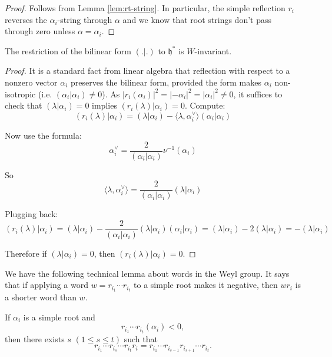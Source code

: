 \documentclass[12pt]{article}
\begin{document}
\begin{proof}
    Follows from Lemma \ref{lem:rt-string}. In particular, the simple reflection $r_i$ reverses the $\alpha_i$-string through $\alpha$ and we know that root strings don't pass through zero unless $\alpha = \alpha_i$.
\end{proof}

\begin{proposition}[3.9]
    The restriction of the bilinear form $(.|.)$ to $\mathfrak{h}^*$ is $W$-invariant.
\end{proposition}

\begin{proof}
    It is a standard fact from linear algebra that reflection with respect to a nonzero vector $\alpha_i$ preserves the bilinear form, provided the form makes $\alpha_i$ non-isotropic (i.e. $(\alpha_i|\alpha_i)\neq 0$). As $|r_i(\alpha_i)|^2 = |-\alpha_i|^2 = |\alpha_i|^2 \neq 0$, it suffices to check that $(\lambda|\alpha_i) = 0$ implies
    $(r_i(\lambda)|\alpha_i) = 0$. Compute:
    \[
        (r_i(\lambda)|\alpha_i) = (\lambda|\alpha_i) - \langle \lambda, \alpha_i^\vee \rangle (\alpha_i|\alpha_i)
    \]

    Now use the formula:
    \[
        \alpha_i^\vee = \frac{2}{(\alpha_i|\alpha_i)}\nu^{-1}(\alpha_i)
    \]

    So
    \[
        \langle \lambda, \alpha_i^\vee \rangle = \frac{2}{(\alpha_i|\alpha_i)} (\lambda|\alpha_i)
    \]

    Plugging back:
    \[
        (r_i(\lambda)|\alpha_i)
        = (\lambda|\alpha_i) - \frac{2}{(\alpha_i|\alpha_i)} (\lambda|\alpha_i)(\alpha_i|\alpha_i)
        = (\lambda|\alpha_i) - 2(\lambda|\alpha_i)
        = -(\lambda|\alpha_i)
    \]

    Therefore if $(\lambda|\alpha_i) = 0$, then $(r_i(\lambda)|\alpha_i)=0$.
\end{proof}



We have the following technical lemma about words in the Weyl group. It says that if applying a word $w = r_{i_1}\cdots r_{i_t}$ to a simple root makes it negative, then $wr_i$ is a shorter word than $w$.

\begin{lemma}\label{lem:exchange}
    If $\alpha_i$ is a simple root and
    \[
        r_{i_1}\cdots r_{i_t}(\alpha_i) < 0,
    \]
    then there exists $s$ $(1 \leq s \leq t)$ such that
    \begin{equation}\label{eq:3.10.1}
        r_{i_1}\cdots r_{i_s}\cdots r_{i_t} r_i
        = r_{i_1}\cdots r_{i_{s-1}} r_{i_{s+1}} \cdots r_{i_t}.
    \end{equation}
\end{lemma}
\end{document}
